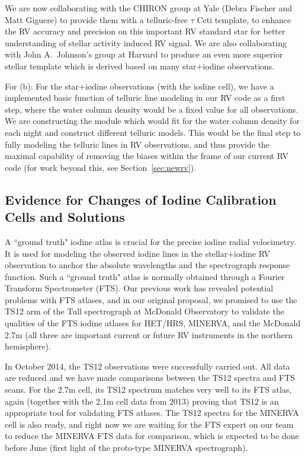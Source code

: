 \documentclass[12pt]{article}
\begin{document}
We are now collaborating with the CHIRON group at Yale (Debra Fischer
and Matt Giguere) to provide them with a telluric-free $\tau$ Ceti
template, to enhance the RV accuracy and precision on this important
RV standard star for better understanding of stellar activity induced
RV signal. We are also collaborating with John A.\ Johnson's group at
Harvard to produce an even more superior stellar template which is
derived based on many star$+$iodine observations.

For (b): For the star$+$iodine observations (with the iodine cell), we
have a implemented basic function of telluric line modeling in our RV
code as a first step, where the water column density would be a fixed
value for all observations. We are constructing the module which would
fit for the water column density for each night and construct
different telluric models. This would be the final step to fully
modeling the telluric lines in RV observations, and thus provide the
maximal capability of removing the biases within the frame of our
current RV code (for work beyond this, see Section~\ref{sec:newrv}).


\vspace{-10pt}
\subsection{Evidence for Changes of Iodine Calibration Cells and Solutions}\label{sec:fts}
\vspace{-5pt}

A ``ground truth" iodine atlas is crucial for the precise iodine
radial velocimetry. It is used for modeling the observed iodine lines
in the stellar$+$iodine RV observation to anchor the absolute
wavelengths and the spectrograph response function. Such a ``ground
truth" atlas is normally obtained through a Fourier Transform
Spectrometer (FTS). Our previous work has revealed potential problems
with FTS atlases, and in our original proposal, we promised to use the
TS12 arm of the Tull spectrograph at McDonald Observatory to validate
the qualities of the FTS iodine atlases for HET/HRS, MINERVA, and the
McDonald 2.7m (all three are important current or future RV
instruments in the northern hemisphere).

In October 2014, the TS12 observations were successfully carried
out. All data are reduced and we have made comparisons between the
TS12 spectra and FTS scans. For the 2.7m cell, its TS12 spectrum
matches very well to its FTS atlas, again (together with the 2.1m cell
data from 2013) proving that TS12 is an appropriate tool for
validating FTS atlases. The TS12 spectra for the MINERVA cell is also
ready, and right now we are waiting for the FTS expert on our team to
reduce the MINERVA FTS data for comparison, which is expected to be
done before June (first light of the proto-type MINERVA spectrograph).
\end{document}
